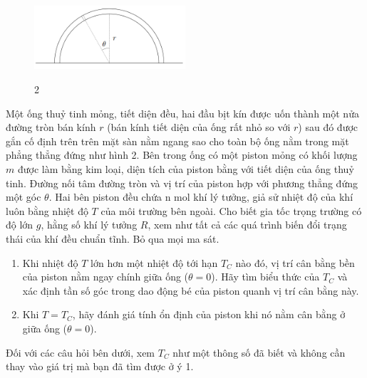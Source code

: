 \begin{figure}
  \centering
  \includegraphics[width=0.5\textwidth]{images/Hinh 2.PNG}
  \vspace{-25px}
  \begin{center}
    \figurename{ 2}
  \end{center}
  \vspace{15px}
\end{figure}

\vspace{-30px}
\noindent Một ống thuỷ tinh mỏng, tiết diện đều, hai đầu bịt kín được uốn thành một nửa đường tròn bán kính $r$ (bán kính tiết diện của ống rất nhỏ so với $r$) sau đó được gắn cố định trên trên mặt sàn nằm ngang sao cho toàn bộ ống nằm trong mặt phẳng thẳng đứng như hình 2. Bên trong ống có một piston mỏng có khối lượng $m$ được làm bằng kim loại, diện tích của piston bằng với tiết diện của ống thuỷ tinh. Đường nối tâm đường tròn và vị trí của piston hợp với phương thẳng đứng một góc $\theta$. Hai bên piston đều chứa n mol khí lý tưởng, giả sử nhiệt độ của khí luôn bằng nhiệt độ $T$ của môi trường bên ngoài. Cho biết gia tốc trọng trường có độ lớn $g$, hằng số khí lý tưởng $R$, xem như tất cả các quá trình biến đổi trạng thái của khí đều chuẩn tĩnh. Bỏ qua mọi ma sát.\\
\vspace{-15pt}
\begin{enumerate}
  \item Khi nhiệt độ $T$ lớn hơn một nhiệt độ tới hạn $T_{C}$ nào đó, vị trí cân bằng bền của piston nằm ngay chính giữa ống ($\theta=0$). Hãy tìm biểu thức của $T_{C}$ và xác định tần số góc trong dao động bé của piston quanh vị trí cân bằng này.
  \item Khi $T=T_{C}$, hãy đánh giá tính ổn định của piston khi nó nằm cân bằng ở giữa ống ($\theta=0$).\\
\end{enumerate}
\vspace{-15px}
\noindent Đối với các câu hỏi bên dưới, xem $T_{C}$ như một thông số đã biết và không cần thay vào giá trị mà bạn đã tìm được ở ý 1.
